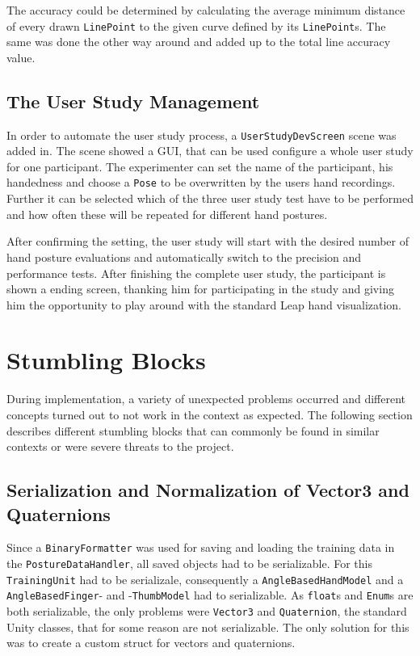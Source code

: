 The accuracy could be determined by calculating the average minimum distance of every drawn \texttt{LinePoint} to the given curve defined by its \texttt{LinePoint}s. The same was done the other way around and added up to the total line accuracy value. 

\subsection{The User Study Management}

In order to automate the user study process, a \texttt{UserStudyDevScreen} scene was added in. The scene showed a GUI, that can be used configure a whole user study for one participant. The experimenter can set the name of the participant, his handedness and choose a \texttt{Pose} to be overwritten by the users hand recordings. Further it can be selected which of the three user study test have to be performed and how often these will be repeated for different hand postures. 

After confirming the setting, the user study will start with the desired number of hand posture evaluations and automatically switch to the precision and performance tests. After finishing the complete user study, the participant is shown a ending screen, thanking him for participating in the study and giving him the opportunity to play around with the standard Leap hand visualization. 

\section{Stumbling Blocks}

During implementation, a variety of unexpected problems occurred and different concepts turned out to not work in the context as expected. The following section describes different stumbling blocks that can commonly be found in similar contexts or were severe threats to the project. 

\subsection{Serialization and Normalization of Vector3 and Quaternions}

Since a \texttt{BinaryFormatter} was used for saving and loading the training data in the \texttt{PostureDataHandler}, all saved objects had to be serializable. For this \texttt{TrainingUnit} had to be serializale, consequently a \texttt{AngleBasedHandModel} and a \texttt{AngleBasedFinger}- and -\texttt{ThumbModel} had to serializable. As \texttt{float}s and \texttt{Enum}s are both serializable, the only problems were \texttt{Vector3} and \texttt{Quaternion}, the standard Unity classes, that for some reason are not serializable. The only solution for this was to create a custom struct for vectors and quaternions. 

